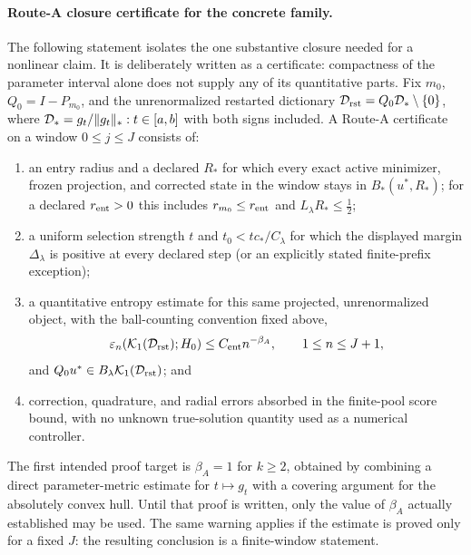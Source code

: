 \documentclass[11pt]{article}
\theoremstyle{remark}
\begin{document}
\paragraph{Route-A closure certificate for the concrete family.}
The following statement isolates the one substantive closure needed for a
nonlinear claim.  It is deliberately written as a certificate: compactness
of the parameter interval alone does not supply any of its quantitative
parts.  Fix $m_0$, $Q_0=I-P_{m_0}$, and the unrenormalized restarted
dictionary $\mathcal D_{\rm rst}=Q_0\mathcal D_*\setminus\{0\}$, where
$\mathcal D_*={g_t/\|g_t\|_*:t\in[a,b]}$ with both signs included.  A
Route-A certificate on a window $0\leq j\leq J$ consists of:
\begin{enumerate}[label=(A\arabic*)]
  \item an entry radius and a declared $R_*$ for which every exact active
  minimizer, frozen projection, and corrected state in the window stays in
  $B_*(u^*,R_*)$; for a declared $r_{\rm ent}>0$ this includes
  $r_{m_0}\leq r_{\rm ent}$ and
  $L_\lambda R_*\leq\tfrac12$;
  \item a uniform selection strength $t$ and $t_0<tc_*/C_\lambda$ for
  which the displayed margin $\Delta_\lambda$ is positive at every
  declared step (or an explicitly stated finite-prefix exception);
  \item a quantitative entropy estimate for this same projected,
  unrenormalized object, with the ball-counting convention fixed above,
  \begin{equation}
    \varepsilon_n\!\left(\mathcal K_1(\mathcal D_{\rm rst});H_0\right)
       \leq C_{\rm ent}n^{-\beta_A},
       \qquad 1\leq n\leq J+1,
    \label{eq:c5-family-entropy-certificate}
  \end{equation}
  and $Q_0u^*\in B_\lambda\mathcal K_1(\mathcal D_{\rm rst})$; and
  \item correction, quadrature, and radial errors absorbed in the
  finite-pool score bound, with no unknown true-solution quantity used as
  a numerical controller.
\end{enumerate}
The first intended proof target is $\beta_A=1$ for $k\geq2$, obtained by
combining a direct parameter-metric estimate for $t\mapsto g_t$ with a
covering argument for the absolutely convex hull.  Until that proof is
written, only the value of $\beta_A$ actually established may be used.
The same warning applies if the estimate is proved only for a fixed $J$:
the resulting conclusion is a finite-window statement.
\end{document}
